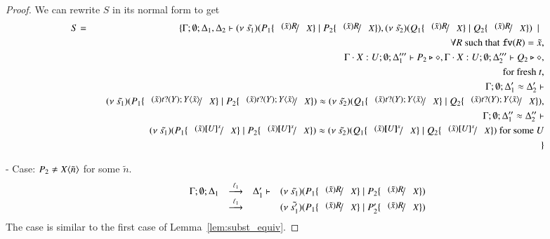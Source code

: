 \begin{proof}
	We can rewrite $S$ in its normal form to get
	\begin{eqnarray*}
		S &=& \set{ \Gamma; \es; \Delta_1, \Delta_2 \proves \newsp{\tilde{s_1}}{P_1 \subst{(\tilde{x}) R}{X} \Par P_2 \subst{(\tilde{x}) R}{X}}, \newsp{\tilde{s_2}}{Q_1 \subst{(\tilde{x}) R}{X} \Par Q_2 \subst{(\tilde{x}) R}{X}} \setbar \\
		&& \quad \forall R \textrm{ such that } \fv{R} = \tilde{x},\\
		&& \quad \Gamma \cat X: U; \es;\Delta_1''' \proves P_2 \hastype \Proc, \Gamma \cat X: U; \es; \Delta_2''' \proves Q_2 \hastype \Proc,\\
		&& \quad \textrm{ for fresh } t,\\
		&& \quad \Gamma; \es; \Delta_1' \wb \Delta_2' \proves \\
		&& \quad \newsp{\tilde{s_1}}{P_1 \subst{(\tilde{x}) \binp{t}{Y} \appl{Y}{\tilde{x}}}{X} \Par P_2 \subst{(\tilde{x}) \binp{t}{Y} \appl{Y}{\tilde{x}}}{X}} \wb \newsp{\tilde{s_2}}{Q_1 \subst{(\tilde{x}) \binp{t}{Y} \appl{Y}{\tilde{x}}}{X} \Par Q_2 \subst{(\tilde{x}) \binp{t}{Y} \appl{Y}{\tilde{x}}}{X}}, \\
		&& \quad \Gamma; \es; \Delta_1'' \wb \Delta_2'' \proves \\
		&& \quad \newsp{\tilde{s_1}}{P_1 \subst{(\tilde{x}) \map{U}^x}{X} \Par P_2 \subst{(\tilde{x}) \map{U}^x}{X}} \wb \newsp{\tilde{s_2}}{Q_1 \subst{(\tilde{x}) \map{U}^x}{X} \Par Q_2 \subst{(\tilde{x}) \map{U}^x}{X}} \textrm{ for some } U \\
		&&}
	\end{eqnarray*}

	\noi - Case: $P_2 \not= X\langle \tilde{n} \rangle$ for some $\tilde{n}$.
%
	\[
	\begin{array}{rcll}
		\Gamma; \es; \Delta_1 &\by{\ell_1}& \Delta_1' \proves& \newsp{\tilde{s_1}}{P_1 \subst{(\tilde{x}) R}{X} \Par P_2 \subst{(\tilde{x}) R}{X}}\\
		&\by{\ell_1} & & \newsp{\tilde{s_1'}}{P_1 \subst{(\tilde{x}) R}{X} \Par P_2' \subst{(\tilde{x}) R}{X}}
	\end{array}
	\]
%
	\noi The case is similar to the first case of Lemma~\ref{lem:subst_equiv}.


\end{proof}
